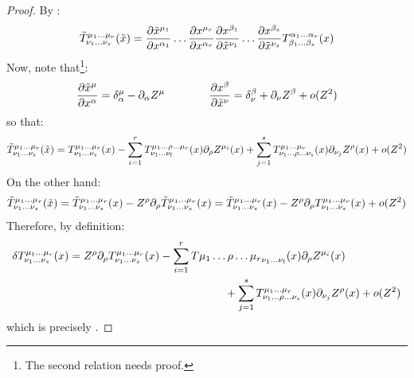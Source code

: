 \begin{proofbox}
  \begin{proof}
    By :
    \begin{equation*}
      \tilde{T}^{\mu_1 \dots \mu_r}_{\nu_1 \dots \nu_s}(\tilde{x}) = \frac{\partial \tilde{x}^{\mu_1}}{\partial x^{\alpha_1}} \dots \frac{\partial x^{\mu_r}}{\partial x^{\alpha_r}} \frac{\partial x^{\beta_1}}{\partial \tilde{x}^{\nu_1}} \dots \frac{\partial x^{\beta_s}}{\partial \tilde{x}^{\nu_s}} T^{\alpha_1 \dots \alpha_r}_{\beta_1 \dots \beta_s}(x)
    \end{equation*}
    Now, note that\footnote{The second relation needs proof.}: %
    \begin{equation*}
      \frac{\partial \tilde{x}^\mu}{\partial x^\alpha} = \delta^\mu_\alpha - \partial_\alpha Z^\mu
      \qquad \qquad
      \frac{\partial x^\beta}{\partial \tilde{x}^\nu} = \delta^\beta_\nu + \partial_\nu Z^\beta + o(Z^2)
    \end{equation*}
    so that:
    \begin{equation*}
      \tilde{T}^{\mu_1 \dots \mu_r}_{\nu_1 \dots \nu_s}(\tilde{x}) = T^{\mu_1 \dots \mu_r}_{\nu_1 \dots \nu_s}(x) - \sum_{i = 1}^r T^{\mu_1 \dots \rho \dots \mu_r}_{\nu_1 \dots \nu_l}(x) \partial_\rho Z^{\mu_i}(x) + \sum_{j = 1}^s T^{\mu_1 \dots \mu_r}_{\nu_1 \dots \rho \dots \nu_s}(x) \partial_{\nu_j} Z^\rho(x) + o(Z^2)
    \end{equation*}
    On the other hand:
    \begin{equation*}
      \tilde{T}^{\mu_1 \dots \mu_r}_{\nu_1 \dots \nu_s}(\tilde{x}) = \tilde{T}^{\mu_1 \dots \mu_r}_{\nu_1 \dots \nu_s}(x) - Z^\rho \partial_\rho \tilde{T}^{\mu_1 \dots \mu_r}_{\nu_1 \dots \nu_s}(x) = \tilde{T}^{\mu_1 \dots \mu_r}_{\nu_1 \dots \nu_s}(x) - Z^\rho \partial_\rho T^{\mu_1 \dots \mu_r}_{\nu_1 \dots \nu_s}(x) + o(Z^2)
    \end{equation*}
    Therefore, by definition:
    \begin{equation*}
      \begin{split}
        \delta T^{\mu_1 \dots \mu_r}_{\nu_1 \dots \nu_s}(x)
        & = Z^\rho \partial_\rho T^{\mu_1 \dots \mu_r}_{\nu_1 \dots \nu_s}(x) - \sum_{i = 1}^r T{\mu_1 \dots \rho \dots \mu_r}_{\nu_1 \dots \nu_l}(x) \partial_\rho Z^{\mu_i}(x) \\
        & \qquad \qquad \qquad \qquad \qquad \qquad \qquad + \sum_{j = 1}^s T^{\mu_1 \dots \mu_r}_{\nu_1 \dots \rho \dots \nu_s}(x) \partial_{\nu_j} Z^\rho(x) + o(Z^2)
      \end{split}
    \end{equation*}
    which is precisely .
  \end{proof}
\end{proofbox}

